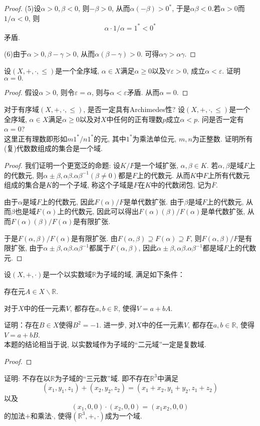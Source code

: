 \begin{quiza}
\begin{proof}
(5)设\(\alpha>0,\beta<0\), 则\(-\beta>0\), 从而\(\alpha(-\beta)>0^*\), 于是\(\alpha\beta<0\).若\(\alpha>0\)而\(1/\alpha<0\), 则\[\alpha\cdot 1/\alpha=1^*<0^*\]矛盾.

(6)由于\(\alpha>0,\beta-\gamma>0\), 从而\(\alpha(\beta-\gamma)>0\). 可得\(\alpha\gamma>\alpha\gamma.\)
\end{proof}
\woe 设\((X,+,\cdot,\leqslant)\)是一个全序域, \(\alpha\in X\)满足\(\alpha\geqslant 0\)以及\(\forall \varepsilon>0\), 成立\(\alpha<\varepsilon\). 证明\(\alpha=0.\)
\begin{proof}
假设\(\alpha>0\), 则令\(\varepsilon=\alpha\), 则与\(\alpha<\varepsilon\)矛盾. 从而\(\alpha=0\).
\end{proof}
\end{quiza}
\begin{quizb}
\woe 对于有序域\((X,+,\cdot,\leqslant)\), 是否一定具有Archimedes性?
\woe 设\((X,+,\cdot,\leqslant)\)是一个全序域, \(\alpha\in X\)满足\(\alpha\geqslant 0\)以及对\(X\)中任何的正有理数\(p\)成立\(\alpha<p\). 问是否一定有\(\alpha=0\)?\\ 这里正有理数即形如\(m1^*/n1^*\)的元, 其中\(1^*\)为乘法单位元, \(m,n\)为正整数.
\woe 证明所有(复)代数数组成的集合是一个域.
\begin{proof}
我们证明一个更宽泛的命题: 设\(K/F\)是一个域扩张, \(\alpha,\beta\in K\). 若\(\alpha,\beta\)是域\(F\)上的代数元, 则\(\alpha\pm\beta,\alpha\beta.\alpha\beta^{-1}(\beta\ne 0)\)都是\(F\)上的代数元. 从而\(K\)中\(F\)上所有代数元组成的集合是\(K\)的一个子域, 称这个子域是\(F\)在\(K\)中的代数闭包, 记为\(\overline{F}\).

由于\(\alpha\)是域\(F\)上的代数元, 因此\(F(\alpha)/F\)是单代数扩张. 由于\(\beta\)是域\(F\)上的代数元, 从而\(\beta\)也是域\(F(\alpha)\)上的代数元, 因此可以得出\(F(\alpha)(\beta)/F(\alpha)\)是单代数扩张, 从而\(F(\alpha)(\beta)/F(\alpha)\)是有限扩张.

于是\(F(\alpha,\beta)/F(\alpha)\)是有限扩张. 由\(F(\alpha,\beta)\supseteq F(\alpha)\supseteq F\), 则\(F(\alpha,\beta)/F\)是有限扩张, 由于\(\alpha\pm\beta,\alpha\beta.\alpha\beta^{-1}\)都属于\(F(\alpha,\beta)\), 因此\(\alpha\pm\beta,\alpha\beta.\alpha\beta^{-1}\)都是域\(F\)上的代数元.
\end{proof}
\woe 设\((X,+,\cdot)\)是一个以实数域\(\mathbb{R}\)为子域的域, 满足如下条件：\begin{compactenum}[(i)]
\item 存在元\(A\in X\backslash\mathbb{R}\).
\item 对于\(X\)中的任一元素\(V\), 都存在\(a,b\in \mathbb{R}\), 使得\(V=a+bA\).
\end{compactenum}
证明：存在\(B\in X\)使得\(B^2=-1\). 进一步, 对\(X\)中的任一元素\(V\), 都存在\(a,b\in \mathbb{R}\), 使得\(V=a+bB\).\\本题的结论相当于说, 以实数域作为子域的“二元域”一定是复数域.
\begin{proof}

\end{proof}
\woe 证明: 不存在以\(\mathbb{R}\)为子域的“三元数”域. 即不存在\(\mathbb{R}^3\)中满足\[(x_1,y_1,z_1)+(x_2,y_2,z_2)=(x_1+x_2,y_1+y_2,z_1+z_2)\]以及\[(x_1,0,0)\cdot (x_2,0,0)=(x_1x_2,0,0)\]的加法\(+\)和乘法\(\cdot\), 使得\((\mathbb{R}^3,+,\cdot)\)成为一个域.
\end{quizb}
